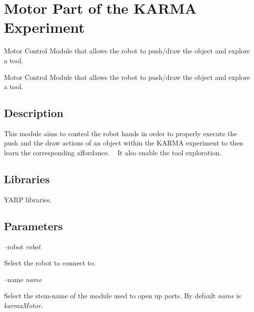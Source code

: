 \section{Motor Part of the K\+A\+R\+MA Experiment}
\label{group__karmaMotor}


Motor Control Module that allows the robot to push/draw the object and explore a tool.  


Motor Control Module that allows the robot to push/draw the object and explore a tool. 

\hypertarget{group__karmaToolProjection_intro_sec}{}\subsection{Description}\label{group__karmaToolProjection_intro_sec}
This module aims to control the robot hands in order to properly execute the push and the draw actions of an object within the K\+A\+R\+MA experiment to then learn the corresponding affordance. ~\newline
 It also enable the tool exploration.\hypertarget{group__karmaToolProjection_lib_sec}{}\subsection{Libraries}\label{group__karmaToolProjection_lib_sec}

\begin{DoxyItemize}
\item Y\+A\+RP libraries.
\end{DoxyItemize}\hypertarget{group__karmaToolProjection_parameters_sec}{}\subsection{Parameters}\label{group__karmaToolProjection_parameters_sec}
--robot {\itshape robot} 
\begin{DoxyItemize}
\item Select the robot to connect to.
\end{DoxyItemize}

--name {\itshape name} 
\begin{DoxyItemize}
\item Select the stem-\/name of the module used to open up ports. By default {\itshape name} is {\itshape karma\+Motor}.
\end{DoxyItemize}

